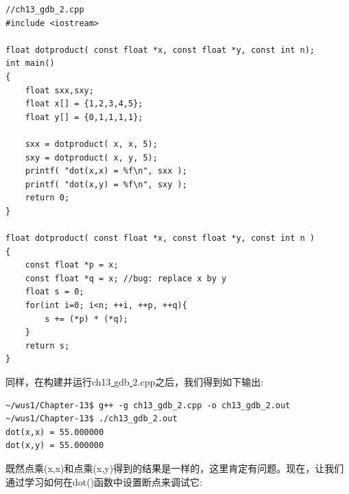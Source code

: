 \begin{lstlisting}[caption={}]
//ch13_gdb_2.cpp
#include <iostream>

float dotproduct( const float *x, const float *y, const int n);
int main()
{
	float sxx,sxy;
	float x[] = {1,2,3,4,5};
	float y[] = {0,1,1,1,1};
	
	sxx = dotproduct( x, x, 5);
	sxy = dotproduct( x, y, 5);
	printf( "dot(x,x) = %f\n", sxx );
	printf( "dot(x,y) = %f\n", sxy );
	return 0;
}

float dotproduct( const float *x, const float *y, const int n )
{
	const float *p = x;
	const float *q = x; //bug: replace x by y
	float s = 0;
	for(int i=0; i<n; ++i, ++p, ++q){
		s += (*p) * (*q);
	}
	return s;
}
\end{lstlisting}

同样，在构建并运行ch13\underline{ }gdb\underline{ }2.cpp之后，我们得到如下输出: \par

\begin{lstlisting}[caption={}]
~/wus1/Chapter-13$ g++ -g ch13_gdb_2.cpp -o ch13_gdb_2.out
~/wus1/Chapter-13$ ./ch13_gdb_2.out
dot(x,x) = 55.000000
dot(x,y) = 55.000000
\end{lstlisting}

既然点乘(x,x)和点乘(x,y)得到的结果是一样的，这里肯定有问题。现在，让我们通过学习如何在dot()函数中设置断点来调试它: \par

